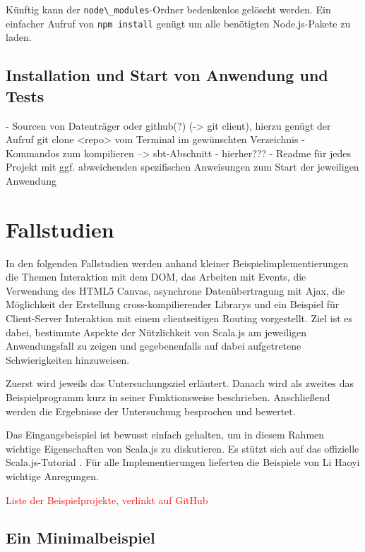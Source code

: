 \documentclass[a4paper, 12pt, hidelinks, listof=totoc, listoftables=totoc, bibliography=totoc]{scrreprt}
\newcommand{\code}[1]{\lstinline[language=Scala, style=inline]|#1|}
\newcommand{\TODO}[1]{\textcolor{red}{#1}\newline}
\begin{document}
Künftig kann der \code{node\_modules}-Ordner bedenkenlos gelöscht werden. Ein einfacher Aufruf von \code{npm install} genügt um alle benötigten Node.js-Pakete zu laden.


\section{Installation und Start von Anwendung und Tests}

- Sourcen von Datenträger oder github(?) (-> git client), hierzu genügt der Aufruf git clone <repo> vom Terminal im gewünschten Verzeichnis
- Kommandos zum kompilieren --> sbt-Abschnitt - hierher???
- Readme für jedes Projekt mit ggf. abweichenden spezifischen Anweisungen zum Start der jeweiligen Anwendung


\chapter{Fallstudien}\label{chap:case-studies}

In den folgenden Fallstudien werden anhand kleiner Beispielimplementierungen die Themen Interaktion mit dem \ac{DOM}, das Arbeiten mit Events, die Verwendung des HTML5 Canvas, asynchrone Datenübertragung mit Ajax, die Möglichkeit der Erstellung cross-kompilierender Librarys und ein Beispiel für Client-Server Interaktion mit einem clientseitigen Routing vorgestellt. Ziel ist es dabei, bestimmte Aspekte der Nützlichkeit von Scala.js am jeweiligen Anwendungsfall zu zeigen und gegebenenfalls auf dabei aufgetretene Schwierigkeiten hinzuweisen.

Zuerst wird jeweils das Untersuchungsziel erläutert. Danach wird als zweites das Beispielprogramm kurz in seiner Funktionsweise beschrieben. Anschließend werden die Ergebnisse der Untersuchung besprochen und bewertet.

Das Eingangsbeispiel ist bewusst einfach gehalten, um in diesem Rahmen wichtige Eigenschaften von Scala.js zu diskutieren. Es stützt sich auf das offizielle Scala.js-Tutorial \cite{scalajs.SJT}. Für alle Implementierungen lieferten die Beispiele von Li Haoyi \cite{haoyi.HOS} wichtige Anregungen.

\TODO{Liste der Beispielprojekte, verlinkt auf GitHub}




\section{Ein Minimalbeispiel}
\end{document}
